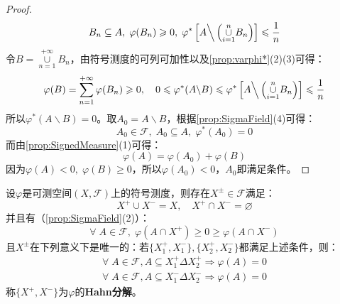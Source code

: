 \begin{proof}
	\begin{equation*}
		B_n\subseteq A,\;\varphi(B_n)\geqslant0,\;\varphi^*\left[A\Big\backslash\left(\underset{i=1}{\overset{n}{\cup}}B_n\right)\right]\leqslant\frac{1}{n}
	\end{equation*}
	令$B=\underset{n=1}{\overset{+\infty}{\cup}}B_n$，由符号测度的可列可加性以及\cref{prop:varphi*}(2)(3)可得：
	\begin{equation*}
		\varphi(B)=\sum_{n=1}^{+\infty}\varphi(B_n)\geqslant0,\quad0\leqslant\varphi^*(A\backslash B)\leqslant\varphi^*\left[A\Big\backslash\left(\underset{i=1}{\overset{n}{\cup}}B_n\right)\right]\leqslant\frac{1}{n}
	\end{equation*}
	所以$\varphi^*(A\backslash B)=0$。取$A_0=A\backslash B$，根据\cref{prop:SigmaField}(4)可得：
	\begin{equation*}
		A_0\in\mathscr{F},\;A_0\subseteq A,\;\varphi^*(A_0)=0
	\end{equation*}
	而由\cref{prop:SignedMeasure}(1)可得：
	\begin{equation*}
		\varphi(A)=\varphi(A_0)+\varphi(B)
	\end{equation*}
	因为$\varphi(A)<0,\;\varphi(B)\geqslant0$，所以$\varphi(A_0)<0$，$A_0$即满足条件。
\end{proof}
\begin{theorem}\label{theo:HahnDecomposition}
	设$\varphi$是可测空间$(X,\mathscr{F})$上的符号测度，则存在$X^{\pm}\in\mathscr{F}$满足：
	\begin{equation*}
		X^+\cup X^-=X,\quad X^+\cap X^-=\varnothing
	\end{equation*}
	并且有（\cref{prop:SigmaField}(2)）：
	\begin{equation*}
		\forall\;A\in\mathscr{F},\;\varphi(A\cap X^+)\geqslant0\geqslant\varphi(A\cap X^-)
	\end{equation*}
	且$X^{\pm}$在下列意义下是唯一的：若$\{X^+_1,X^-_1\},\{X^+_2,X^-_2\}$都满足上述条件，则：
	\begin{gather*}
		\forall\;A\in\mathscr{F},A\subseteq X^+_1\Delta X^+_2\Rightarrow\varphi(A)=0 \\
		\forall\;A\in\mathscr{F},A\subseteq X^-_1\Delta X^-_2\Rightarrow\varphi(A)=0
	\end{gather*}
	称$\{X^+,X^-\}$为$\varphi$的\textbf{Hahn分解}。
\end{theorem}
